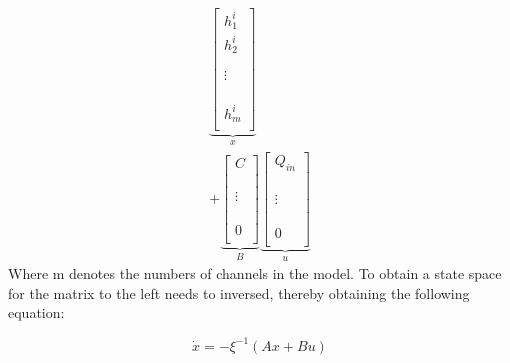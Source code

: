 \begin{equation}
\begin{aligned}
	    	\underbrace{\begin{bmatrix}
		h_{1}^{i} \\
		h_{2}^{i}\\
					\\
					\\
		\vdots		\\
					\\
					\\
					\\
		h_{m}^{i}\\
		\end{bmatrix}}_{x}
		\\
	+ \underbrace{\begin{bmatrix}
		C \\
		\\
					\\
					\\
		\vdots		\\
					\\
					\\
					\\
		0\\
		\end{bmatrix}}_{B}
		\underbrace{\begin{bmatrix}
		Q_{in} \\
		\\
					\\
					\\
		\vdots		\\
					\\
					\\
					\\
		0\\
		\end{bmatrix}}_{u}
	\end{aligned}
\end{equation}
Where m denotes the numbers of channels in the model.  
To obtain a state space for the matrix to the left needs to inversed, thereby obtaining the following equation:

\begin{equation}
	\dot{x} = -\xi^{-1} (Ax+Bu)
\end{equation}


